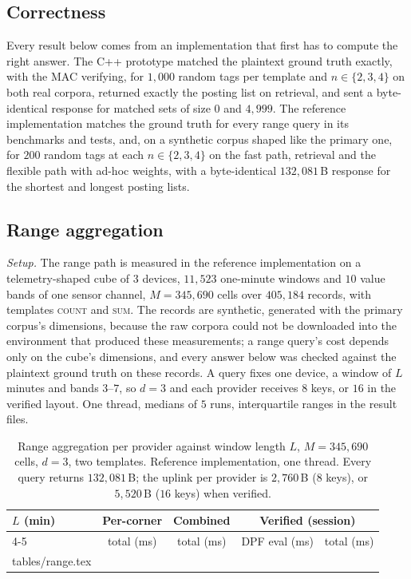\documentclass[a4paper,fleqn]{cas-sc}
\newif\ifauthorchecks
\newcommand{\authorcheck}[1]{\ifauthorchecks{\color{red}\textsf{[Authors: #1]}}\fi}
\begin{document}
\subsection{Correctness}
\label{sec:correctness}
Every result below comes from an implementation that first has to compute the
right answer. The C++ prototype matched the plaintext ground truth exactly, with
the MAC verifying, for $1{,}000$ random tags per template and $n\in\{2,3,4\}$ on
both real corpora, returned exactly the posting list on retrieval, and sent a
byte-identical response for matched sets of size $0$ and $4{,}999$. The
reference implementation matches the ground truth for every range query in its
benchmarks and tests, and, on a synthetic corpus shaped like the primary one,
for $200$ random tags at each $n\in\{2,3,4\}$ on the fast path, retrieval and
the flexible path with ad-hoc weights, with a byte-identical $132{,}081$\,B
response for the shortest and longest posting lists.
\authorcheck{Run bench/correctness.py on both real corpora (it needs the raw
files, see data/README.md) and report the counts here.}

\subsection{Range aggregation}
\label{sec:rangeresult}
\emph{Setup.} The range path is measured in the reference implementation on a
telemetry-shaped cube of $3$ devices, $11{,}523$ one-minute windows and $10$
value bands of one sensor channel, $M=345{,}690$ cells over $405{,}184$
records, with templates \textsc{count} and \textsc{sum}. The records are
synthetic, generated with the primary corpus's dimensions, because the raw
corpora could not be downloaded into the environment that produced these
measurements; a range query's cost depends only on the cube's dimensions, and
every answer below was checked against the plaintext ground truth on these
records. A query fixes one device, a window of $L$ minutes and bands $3$--$7$,
so $d=3$ and each provider receives $8$ keys, or $16$ in the verified layout.
One thread, medians of $5$ runs, interquartile ranges in the result files.

\begin{table}[pos=htbp]
\caption{Range aggregation per provider against window length $L$,
$M=345{,}690$ cells, $d=3$, two templates. Reference implementation, one
thread. Every query returns $132{,}081$\,B; the uplink per provider is
$2{,}760$\,B ($8$ keys), or $5{,}520$\,B ($16$ keys) when verified.}
\label{tab:range}
\centering
\footnotesize
\begin{tabular*}{\tblwidth}{@{\extracolsep{\fill}}lcccc@{}}
\toprule
$L$ (min) & Per-corner & Combined & \multicolumn{2}{c}{Verified (session)} \\
\cmidrule(lr){4-5}
 & total (ms) & total (ms) & DPF eval (ms) & total (ms) \\
\midrule
{} tables/range.tex 
\bottomrule
\end{tabular*}
\end{table}
\end{document}
